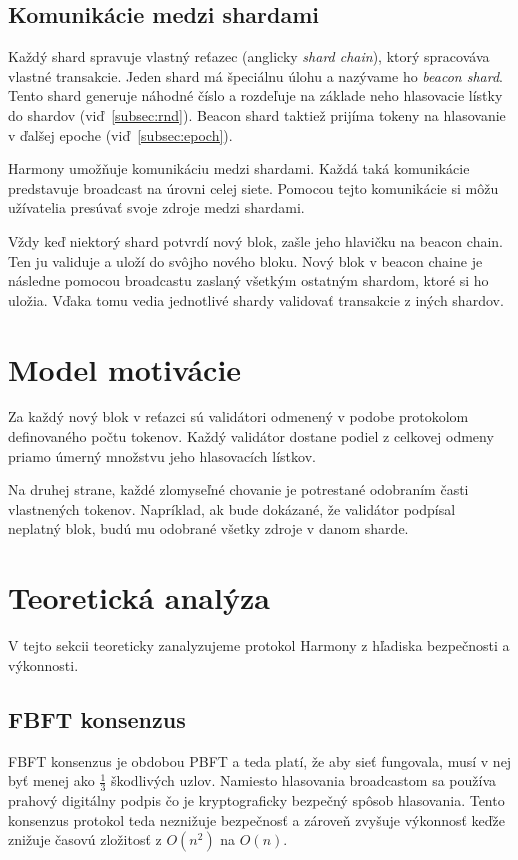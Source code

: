 \subsection{Komunikácie medzi shardami}\label{subsec:cross-com}
Každý shard spravuje vlastný reťazec (anglicky \textit{shard chain}), ktorý spracováva vlastné transakcie. Jeden shard má špeciálnu úlohu a nazývame ho \textit{beacon shard}. Tento shard generuje náhodné číslo a rozdeľuje na základe neho hlasovacie lístky do shardov (viď~\ref{subsec:rnd}). Beacon shard taktiež prijíma tokeny na hlasovanie v ďalšej epoche (viď~\ref{subsec:epoch}).

Harmony umožňuje komunikáciu medzi shardami. Každá taká komunikácie predstavuje broadcast na úrovni celej siete. Pomocou tejto komunikácie si môžu užívatelia presúvať svoje zdroje medzi shardami. 

Vždy keď niektorý shard potvrdí nový blok, zašle jeho hlavičku na beacon chain. Ten ju validuje a uloží do svôjho nového bloku. Nový blok v beacon chaine je následne pomocou broadcastu zaslaný všetkým ostatným shardom, ktoré si ho uložia. Vďaka tomu vedia jednotlivé shardy validovať transakcie z iných shardov.

\section{Model motivácie}

Za každý nový blok v reťazci sú validátori odmenený v podobe protokolom definovaného počtu tokenov. Každý validátor dostane podiel z celkovej odmeny priamo úmerný množstvu jeho hlasovacích lístkov.

Na druhej strane, každé zlomyseľné chovanie je potrestané odobraním časti vlastnených tokenov. Napríklad, ak bude dokázané, že validátor podpísal neplatný blok, budú mu odobrané všetky zdroje v danom sharde.

\section{Teoretická analýza}\label{sec:harmony-analyze}
V tejto sekcii teoreticky zanalyzujeme protokol Harmony z hľadiska bezpečnosti a výkonnosti.

\subsection{FBFT konsenzus}
FBFT konsenzus je obdobou PBFT a teda platí, že aby sieť fungovala, musí v nej byť menej ako $\frac{1}{3}$ škodlivých uzlov. Namiesto hlasovania broadcastom sa používa prahový digitálny podpis čo je kryptograficky bezpečný spôsob hlasovania. Tento konsenzus protokol teda neznižuje bezpečnosť a zároveň zvyšuje výkonnosť keďže znižuje časovú zložitosť z $O(n^2)$ na $O(n)$.

